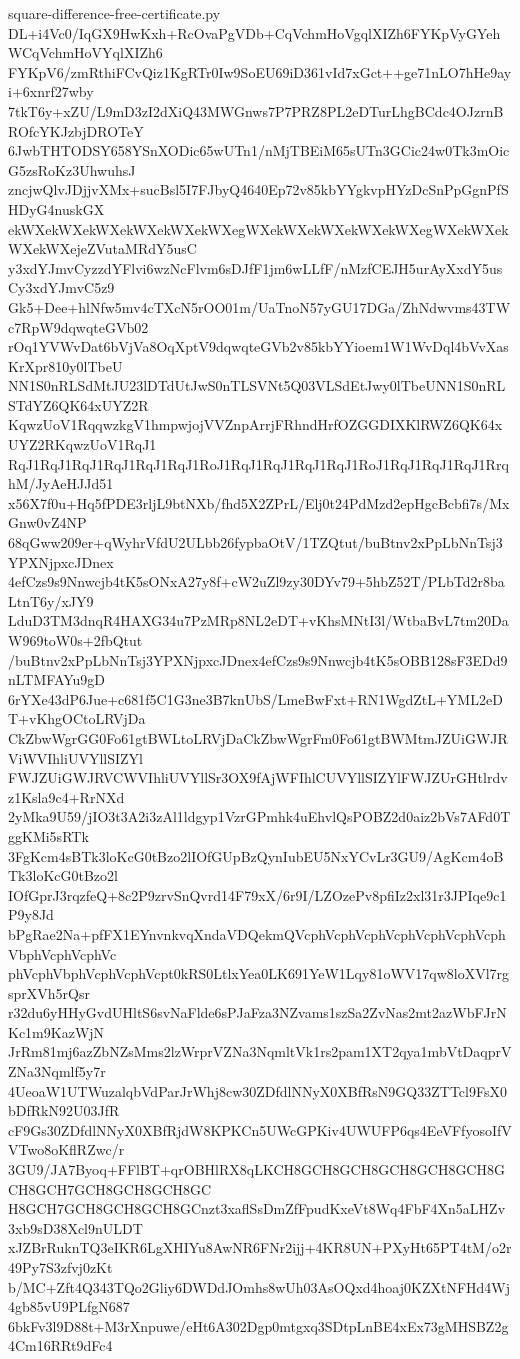 \documentclass[11pt]{article}
\theoremstyle{definition}
\theoremstyle{remark}
\begin{document}
\begin{filecontents*}[overwrite]{square-difference-free-certificate.py}
DL+i4Vc0/IqGX9HwKxh+RcOvaPgVDb+CqVchmHoVgqlXIZh6FYKpVyGYehWCqVchmHoVYqlXIZh6
FYKpV6/zmRthiFCvQiz1KgRTr0Iw9SoEU69iD361vId7xGct++ge71nLO7hHe9ayi+6xnrf27wby
7tkT6y+xZU/L9mD3zI2dXiQ43MWGnws7P7PRZ8PL2eDTurLhgBCdc4OJzrnBROfcYKJzbjDROTeY
6JwbTHTODSY658YSnXODic65wUTn1/nMjTBEiM65sUTn3GCic24w0Tk3mOicG5zsRoKz3UhwuhsJ
zncjwQlvJDjjvXMx+sucBsl5I7FJbyQ4640Ep72v85kbYYgkvpHYzDcSnPpGgnPfSHDyG4nuskGX
ekWXekWXekWXekWXekWXekWXegWXekWXekWXekWXekWXegWXekWXekWXekWXejeZVutaMRdY5usC
y3xdYJmvCyzzdYFlvi6wzNcFlvm6sDJfF1jm6wLLfF/nMzfCEJH5urAyXxdY5usCy3xdYJmvC5z9
Gk5+Dee+hlNfw5mv4cTXcN5rOO01m/UaTnoN57yGU17DGa/ZhNdwvms43TWc7RpW9dqwqteGVb02
rOq1YVWvDat6bVjVa8OqXptV9dqwqteGVb2v85kbYYioem1W1WvDql4bVvXasKrXpr810y0lTbeU
NN1S0nRLSdMtJU23lDTdUtJwS0nTLSVNt5Q03VLSdEtJwy0lTbeUNN1S0nRLSTdYZ6QK64xUYZ2R
KqwzUoV1RqqwzkgV1hmpwjojVVZnpArrjFRhndHrfOZGGDIXKlRWZ6QK64xUYZ2RKqwzUoV1RqJ1
RqJ1RqJ1RqJ1RqJ1RqJ1RqJ1RoJ1RqJ1RqJ1RqJ1RqJ1RoJ1RqJ1RqJ1RqJ1RrqhM/JyAeHJJd51
x56X7f0u+Hq5fPDE3rljL9btNXb/fhd5X2ZPrL/Elj0t24PdMzd2epHgcBcbfi7s/MxGnw0vZ4NP
68qGww209er+qWyhrVfdU2ULbb26fypbaOtV/1TZQtut/buBtnv2xPpLbNnTsj3YPXNjpxcJDnex
4efCzs9s9Nnwcjb4tK5sONxA27y8f+cW2uZl9zy30DYv79+5hbZ52T/PLbTd2r8baLtnT6y/xJY9
LduD3TM3dnqR4HAXG34u7PzMRp8NL2eDT+vKhsMNtI3l/WtbaBvL7tm20DaW969toW0s+2fbQtut
/buBtnv2xPpLbNnTsj3YPXNjpxcJDnex4efCzs9s9Nnwcjb4tK5sOBB128sF3EDd9nLTMFAYu9gD
6rYXe43dP6Jue+c681f5C1G3ne3B7knUbS/LmeBwFxt+RN1WgdZtL+YML2eDT+vKhgOCtoLRVjDa
CkZbwWgrGG0Fo61gtBWLtoLRVjDaCkZbwWgrFm0Fo61gtBWMtmJZUiGWJRViWVIhliUVYllSIZYl
FWJZUiGWJRVCWVIhliUVYllSr3OX9fAjWFIhlCUVYllSIZYlFWJZUrGHtlrdvz1Ksla9c4+RrNXd
2yMka9U59/jIO3t3A2i3zAl1ldgyp1VzrGPmhk4uEhvlQsPOBZ2d0aiz2bVs7AFd0TggKMi5sRTk
3FgKcm4sBTk3loKcG0tBzo2lIOfGUpBzQynIubEU5NxYCvLr3GU9/AgKcm4oBTk3loKcG0tBzo2l
IOfGprJ3rqzfeQ+8c2P9zrvSnQvrd14F79xX/6r9I/LZOzePv8pfiIz2xl31r3JPIqe9c1P9y8Jd
bPgRae2Na+pfFX1EYnvnkvqXndaVDQekmQVcphVcphVcphVcphVcphVcphVcphVbphVcphVcphVc
phVcphVbphVcphVcphVcpt0kRS0LtlxYea0LK691YeW1Lqy81oWV17qw8loXVl7rgsprXVh5rQsr
r32du6yHHyGvdUHltS6svNaFlde6sPJaFza3NZvams1szSa2ZvNas2mt2azWbFJrNKc1m9KazWjN
JrRm81mj6azZbNZsMms2lzWrprVZNa3NqmltVk1rs2pam1XT2qya1mbVtDaqprVZNa3Nqmlf5y7r
4UeoaW1UTWuzalqbVdParJrWhj8cw30ZDfdlNNyX0XBfRsN9GQ33ZTTcl9FsX0bDfRkN92U03JfR
cF9Gs30ZDfdlNNyX0XBfRjdW8KPKCn5UWcGPKiv4UWUFP6qs4EeVFfyosoIfVVTwo8oKflRZwc/r
3GU9/JA7Byoq+FFlBT+qrOBHlRX8qLKCH8GCH8GCH8GCH8GCH8GCH8GCH8GCH7GCH8GCH8GCH8GC
H8GCH7GCH8GCH8GCH8GCnzt3xaflSsDmZfFpudKxeVt8Wq4FbF4Xn5aLHZv3xb9sD38Xcl9nULDT
xJZBrRuknTQ3eIKR6LgXHIYu8AwNR6FNr2ijj+4KR8UN+PXyHt65PT4tM/o2r49Py7S3zfvj0zKt
b/MC+Zft4Q343TQo2Gliy6DWDdJOmhs8wUh03AsOQxd4hoaj0KZXtNFHd4Wj4gb85vU9PLfgN687
6bkFv3l9D88t+M3rXnpuwe/eHt6A302Dgp0mtgxq3SDtpLnBE4xEx73gMHSBZ2g4Cm16RRt9dFc4

\end{filecontents*}
\end{document}
